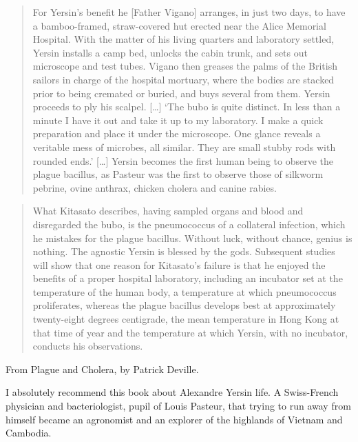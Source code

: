\documentclass[
  12pt,
]{book}
\newenvironment{rnote}{\par\raggedleft}{\par}
\begin{document}
\begin{quote}
For Yersin's benefit he {[}Father Vigano{]} arranges, in just two days, to have a bamboo-framed, straw-covered hut erected near the Alice Memorial Hospital. With the matter of his living quarters and laboratory settled, Yersin installs a camp bed, unlocks the cabin trunk, and sets out microscope and test tubes. Vigano then greases the palms of the British sailors in charge of the hospital mortuary, where the bodies are stacked prior to being cremated or buried, and buys several from them. Yersin proceeds to ply his scalpel. {[}\ldots{]} `The bubo is quite distinct. In less than a minute I have it out and take it up to my laboratory. I make a quick preparation and place it under the microscope. One glance reveals a veritable mess of microbes, all similar. They are small stubby rods with rounded ends.' {[}\ldots{]} Yersin becomes the first human being to observe the plague bacillus, as Pasteur was the first to observe those of silkworm pebrine, ovine anthrax, chicken cholera and canine rabies.
\end{quote}

\begin{quote}
What Kitasato describes, having sampled organs and blood and disregarded the bubo, is the pneumococcus of a collateral infection, which he mistakes for the plague bacillus. Without luck, without chance, genius is nothing. The agnostic Yersin is blessed by the gods. Subsequent studies will show that one reason for Kitasato's failure is that he enjoyed the benefits of a proper hospital laboratory, including an incubator set at the temperature of the human body, a temperature at which pneumococcus proliferates, whereas the plague bacillus develops best at approximately twenty-eight degrees centigrade, the mean temperature in Hong Kong at that time of year and the temperature at which Yersin, with no incubator, conducts his observations.
\end{quote}

\begin{rnote}
From Plague and Cholera, by Patrick Deville. \citep{deville2014plague}

\end{rnote}

I absolutely recommend this book about Alexandre Yersin life. A Swiss-French physician and bacteriologist, pupil of Louis Pasteur, that trying to run away from himself became an agronomist and an explorer of the highlands of Vietnam and Cambodia.
\end{document}
